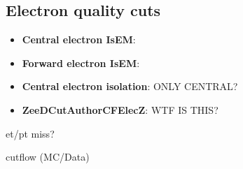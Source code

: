 \subsection{Electron quality cuts}
\label{sec:Sel_isem_iso}

\begin{itemize}
\item {\bfseries Central electron IsEM}:
\item {\bfseries Forward electron IsEM}:
\item {\bfseries Central electron isolation}: \tbu ONLY CENTRAL?
\item {\bfseries ZeeDCutAuthorCFElecZ}: \tbu WTF IS THIS?
\end{itemize}

\tbu et/pt miss?

cutflow (MC/Data)
